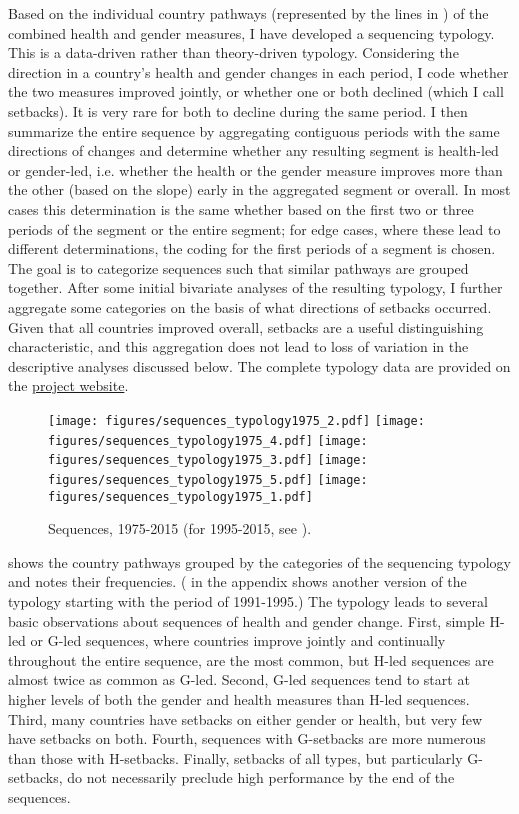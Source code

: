 \documentclass[12pt]{article}
\begin{document}
Based on the individual country pathways (represented by the lines in ) of the combined health and gender measures, I have developed a sequencing typology.
This is a data-driven rather than theory-driven typology.
Considering the direction in a country's health and gender changes in each period, I code whether the two measures improved jointly, or whether one or both declined (which I call setbacks).
It is very rare for both to decline during the same period.
I then summarize the entire sequence by aggregating contiguous periods with the same directions of changes and determine whether any resulting segment is health-led or gender-led, i.e. whether the health or the gender measure improves more than the other (based on the slope) early in the aggregated segment or overall.
In most cases this determination is the same whether based on the first two or three periods of the segment or the entire segment; for edge cases, where these lead to different determinations, the coding for the first periods of a segment is chosen.
The goal is to categorize sequences such that similar pathways are grouped together.
After some initial bivariate analyses of the resulting typology, I further aggregate some categories on the basis of what directions of setbacks occurred.
Given that all countries improved overall, setbacks are a useful distinguishing characteristic, and this aggregation does not lead to loss of variation in the descriptive analyses discussed below.
The complete typology data are provided on the \href{https://timothoms.github.io/LSC-MWG/sequencing.html}{project website}.

\begin{figure}[htbp]
    \centering
    \caption{Sequences, 1975-2015 (for 1995-2015, see ).}
    \label{sequences_typology1975}
    \texttt{[image: figures/sequences\_typology1975\_2.pdf]}
    \texttt{[image: figures/sequences\_typology1975\_4.pdf]}
    \texttt{[image: figures/sequences\_typology1975\_3.pdf]}
    \texttt{[image: figures/sequences\_typology1975\_5.pdf]}
    \texttt{[image: figures/sequences\_typology1975\_1.pdf]}
\end{figure}

 shows the country pathways grouped by the categories of the sequencing typology and notes their frequencies.
( in the appendix shows another version of the typology starting with the period of 1991-1995.)
The typology leads to several basic observations about sequences of health and gender change.
First, simple H-led or G-led sequences, where countries improve jointly and continually throughout the entire sequence, are the most common, but H-led sequences are almost twice as common as G-led.
Second, G-led sequences tend to start at higher levels of both the gender and health measures than H-led sequences.
Third, many countries have setbacks on either gender or health, but very few have setbacks on both.
Fourth, sequences with G-setbacks are more numerous than those with H-setbacks.
Finally, setbacks of all types, but particularly G-setbacks, do not necessarily preclude high performance by the end of the sequences.
\end{document}
